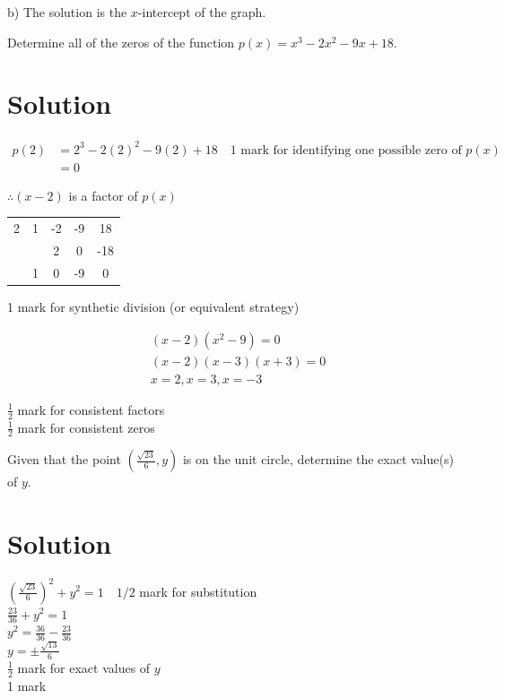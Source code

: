 \documentclass[10pt]{article}
\begin{document}
b) The solution is the $x$-intercept of the graph.

Determine all of the zeros of the function $p(x)=x^{3}-2 x^{2}-9 x+18$.

\section*{Solution}
$$
\begin{aligned}
p(2) & =2^{3}-2(2)^{2}-9(2)+18 \quad 1 \text { mark for identifying one possible zero of } p(x) \\
& =0
\end{aligned}
$$

$\therefore(x-2)$ is a factor of $p(x)$

\begin{center}
\begin{tabular}{c|cccc}
2 & 1 & -2 & -9 & 18 \\
 &  & 2 & 0 & -18 \\
\hline
 & 1 & 0 & -9 & 0 \\
\hline
\end{tabular}
\end{center}

1 mark for synthetic division (or equivalent strategy)

$$
\begin{aligned}
& (x-2)\left(x^{2}-9\right)=0 \\
& (x-2)(x-3)(x+3)=0 \\
& x=2, x=3, x=-3
\end{aligned}
$$

$\frac{1}{2}$ mark for consistent factors\\
$\frac{1}{2}$ mark for consistent zeros

Given that the point $\left(\frac{\sqrt{23}}{6}, y\right)$ is on the unit circle, determine the exact value(s) of $y$.

\section*{Solution}
$\left(\frac{\sqrt{23}}{6}\right)^{2}+y^{2}=1 \quad 1 / 2$ mark for substitution\\
$\frac{23}{36}+y^{2}=1$\\
$y^{2}=\frac{36}{36}-\frac{23}{36}$\\
$y= \pm \frac{\sqrt{13}}{6}$\\
$\frac{1}{2}$ mark for exact values of $y$\\
1 mark
\end{document}
